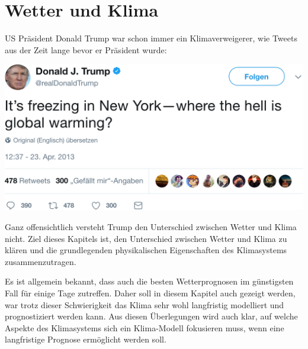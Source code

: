 %
%
%
%
\chapter{Wetter und Klima\label{chapter:wetter und klima}}
US Präsident Donald Trump war schon immer ein Klimaverweigerer, wie Tweets
aus der Zeit lange bevor er Präsident wurde:
\begin{center}
\includegraphics[width=0.6\hsize]{chapters/1/trump.png}
\end{center}
Ganz offensichtlich versteht Trump den Unterschied zwischen Wetter und
Klima nicht.
Ziel dieses Kapitels ist, den Unterschied zwischen Wetter und Klima
zu klären und die grundlegenden physikalischen Eigenschaften des
Klimasystems zusammenzutragen.

Es ist allgemein bekannt, dass auch die besten Wetterprognosen im
günstigsten Fall für einige Tage zutreffen.
Daher soll in diesem Kapitel auch gezeigt werden, war trotz dieser
Schwierigkeit das Klima sehr wohl langfristig modelliert und prognostiziert
werden kann.
Aus diesen Überlegungen wird auch klar, auf welche Aspekte des Klimasystems
sich ein Klima-Modell fokusieren muss, wenn eine langfristige Prognose
ermöglicht werden soll.





